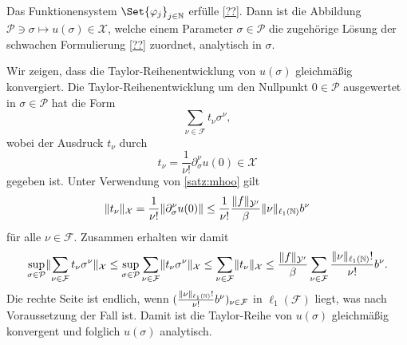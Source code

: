 \begin{Satz}
    Das Funktionensystem $\Set{\varphi_{j}}_{j \in \mathbb{N}}$ erfülle \cref{??}.
    Dann ist die Abbildung $\mathcal P \ni \sigma \mapsto u(\sigma) \in \mathcal X$, welche einem Parameter $\sigma \in \mathcal P$ die zugehörige Lösung der schwachen Formulierung \cref{??} zuordnet, analytisch in $\sigma$.

    \begin{Beweis}
        Wir zeigen, dass die Taylor-Reihenentwicklung von $u(\sigma)$ gleichmäßig konvergiert.
        Die Taylor-Reihenentwicklung um den Nullpunkt $0 \in \mathcal P$ ausgewertet in $\sigma \in \mathcal P$ hat die Form
        \begin{equation}
            \sum_{\nu \in \mathcal F} t_{\nu} \sigma^{\nu},
        \end{equation}
        wobei der Ausdruck $t_{\nu}$ durch
        \begin{equation}
            t_{\nu} = \frac{1}{\nu!} \partial^{\nu}_{\sigma} u(0) \in \mathcal X
        \end{equation}
        gegeben ist.
        Unter Verwendung von \cref{satz:mhoo} gilt
        \begin{align}
            \lVert t_{\nu}\rVert_{\mathcal X}
            = \frac{1}{\nu!} \lVert\partial^{\nu}_{\sigma} u(0)\rVert
            \leq \frac{1}{\nu!} \frac{\lVert f\rVert_{\mathcal Y'}}{\beta} \lVert\nu\rVert_{\ell_{1}(\mathbb{N})} b^{\nu}
        \end{align}
        für alle $\nu \in \mathcal F$.
        Zusammen erhalten wir damit
        \begin{equation}
            \begin{aligned}
                \sup_{\sigma \in \mathcal P} \lVert\sum_{\nu \in \mathcal F} t_{\nu} \sigma^{\nu}\rVert_{\mathcal X}
                \leq \sup_{\sigma \in \mathcal P} \sum_{\nu \in \mathcal F} \lVert t_{\nu} \sigma^{\nu}\rVert_{\mathcal X}
                \leq \sum_{\nu \in \mathcal F} \lVert t_{\nu}\rVert_{\mathcal X}
                \leq \frac{\lVert f\rVert_{\mathcal Y'}}{\beta} \sum_{\nu \in \mathcal F} \frac{\lVert\nu\rVert_{\ell_{1}(\mathbb{N})}!}{\nu!} b^{\nu}.
            \end{aligned}
        \end{equation}
        Die rechte Seite ist endlich, wenn $(\frac{\lVert\nu\rVert_{\ell_{1}(\mathbb{N})}!}{\nu!} b^{\nu})_{\nu \in \mathcal F}$ in $\ell_{1}(\mathcal F)$ liegt, was nach Voraussetzung der Fall ist.
        Damit ist die Taylor-Reihe von $u(\sigma)$ gleichmäßig konvergent und folglich $u(\sigma)$ analytisch.
    \end{Beweis}
\end{Satz}

